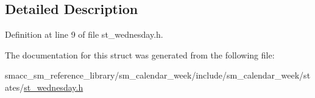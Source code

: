 \subsection{Detailed Description}


Definition at line 9 of file st\+\_\+wednesday.\+h.



The documentation for this struct was generated from the following file\+:\begin{DoxyCompactItemize}
\item 
smacc\+\_\+sm\+\_\+reference\+\_\+library/sm\+\_\+calendar\+\_\+week/include/sm\+\_\+calendar\+\_\+week/states/\hyperlink{st__wednesday_8h}{st\+\_\+wednesday.\+h}\end{DoxyCompactItemize}
